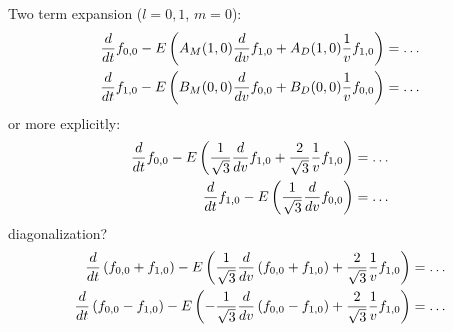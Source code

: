 \documentclass{article}[draft]
\begin{document}
Two term expansion ($l = 0,1$, $m=0$):
\begin{align*}
\frac{d}{dt} f_{0,0} - E 
\left( A_M\of{1,0} \frac{d}{d\vr} f_{1,0} 
+ A_D\of{1,0} \frac{1}{\vr} f_{1,0} \right) &= \ldots
\\
\frac{d}{dt} f_{1,0} - E 
\left( B_M\of{0,0} \frac{d}{d\vr} f_{0,0} 
+ B_D\of{0,0} \frac{1}{\vr} f_{0,0} \right) &= \ldots
\end{align*}
or more explicitly:
\begin{align*}
\frac{d}{dt} f_{0,0} - E 
\left( \frac{1}{\sqrt{3}} \frac{d}{dv} f_{1,0} 
+  \frac{2}{\sqrt{3}} \frac{1}{v} f_{1,0} \right) &= \ldots
\\
\frac{d}{dt} f_{1,0} - E 
\left( \frac{1}{\sqrt{3}} \frac{d}{dv} f_{0,0} \right) &= \ldots
\end{align*}
diagonalization?
\begin{align*}
\frac{d}{dt} \left( f_{0,0} + f_{1,0} \right) - E 
\left( \frac{1}{\sqrt{3}} \frac{d}{dv} \left( f_{0,0} + f_{1,0} \right) 
+  \frac{2}{\sqrt{3}} \frac{1}{v} f_{1,0} \right) &= \ldots
\\
\frac{d}{dt} \left( f_{0,0} - f_{1,0} \right) - E 
\left( - \frac{1}{\sqrt{3}} \frac{d}{dv} \left( f_{0,0} - f_{1,0} \right) 
+  \frac{2}{\sqrt{3}} \frac{1}{v} f_{1,0} \right) &= \ldots
\end{align*}
\end{document}
